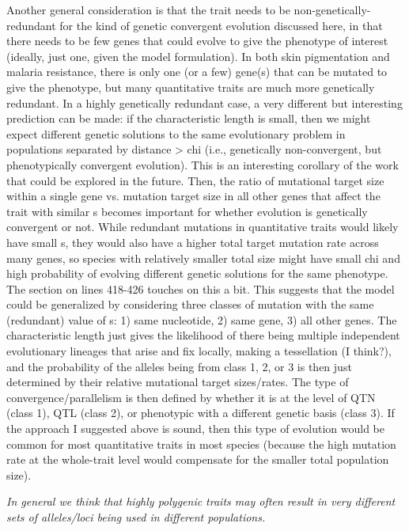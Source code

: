 \documentclass[12pt,letterpaper]{article}
\newcommand{\response}[1]{\emph{ \color{blue} #1}}
\begin{document}
Another general consideration is that the trait needs to be non-genetically-redundant for the kind of genetic convergent evolution discussed here, in that there needs to be few genes that could evolve to give the phenotype of interest (ideally, just one, given the model formulation). In both skin pigmentation and malaria resistance, there is only one (or a few) gene(s) that can be mutated to give the phenotype, but many quantitative traits are much more genetically redundant. In a highly genetically redundant case, a very different but interesting prediction can be made: if the characteristic length is small, then we might expect different genetic solutions to the same evolutionary problem in populations separated by distance > chi (i.e., genetically non-convergent, but phenotypically convergent evolution). This is an interesting corollary of the work that could be explored in the future. Then, the ratio of {mutational target size within a single gene} vs. {mutation target size in all other genes that affect the trait with similar s} becomes important for whether evolution is genetically convergent or not. While redundant mutations in quantitative traits would likely have small s, they would also have a higher total target mutation rate across many genes, so species with relatively smaller total size might have small chi and high probability of evolving different genetic solutions for the same phenotype. The section on lines 418-426 touches on this a bit. This suggests that the model could be generalized by considering three classes of mutation with the same (redundant) value of s: 1) same nucleotide, 2) same gene, 3) all other genes. The characteristic length just gives the likelihood of there being multiple independent evolutionary lineages that arise and fix locally, making a tessellation (I think?), and the probability of the alleles being from class 1, 2, or 3 is then just determined by their relative mutational target sizes/rates. The type of convergence/parallelism is then defined by whether it is at the level of QTN (class 1), QTL (class 2), or phenotypic with a different genetic basis (class 3). If the approach I suggested above is sound, then this type of evolution would be common for most quantitative traits in most species (because the high mutation rate at the whole-trait level would compensate for the smaller total population size).

\response{In general we think that highly polygenic traits may often result in very different sets of alleles/loci being used  in different populations. }
\end{document}
